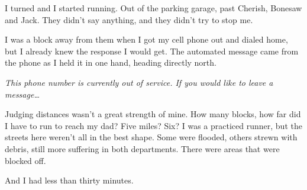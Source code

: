 I turned and I started running.  Out of the parking garage, past Cherish, Bonesaw and Jack.  They didn't say anything, and they didn't try to stop me.



I was a block away from them when I got my cell phone out and dialed home, but I already knew the response I would get.  The automated message came from the phone as I held it in one hand, heading directly north.



\emph{This phone number is currently out of service.  If you would like to leave a message\ldots}



Judging distances wasn't a great strength of mine.  How many blocks, how far did I have to run to reach my dad?  Five miles? Six?  I was a practiced runner, but the streets here weren't all in the best shape.  Some were flooded, others strewn with debris, still more suffering in both departments.  There were areas that were blocked off.



And I had less than thirty minutes.






